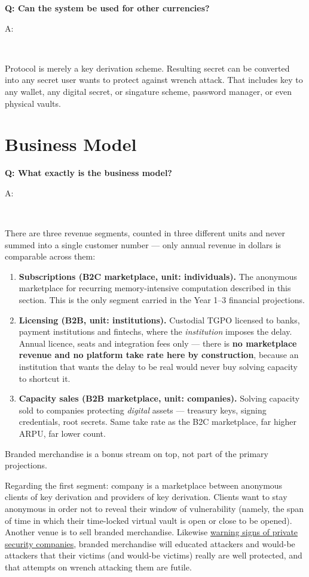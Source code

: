 \documentclass[12pt,a4paper]{article}
\newenvironment{question}[1]{%
  \vspace{0.8em}\noindent\textbf{Q: #1}\par
  \vspace{0.2em}\noindent\begin{itshape}A:\end{itshape}~%
}{\vspace{0.8em}}
\newcommand{\privsecplaque}{https://duckduckgo.com/?q=prosegur+verisure+\%22warning+sign\%22+facade\&iar=images\&t=brave\&iaf=type\%3Aphoto}
\begin{document}
\begin{question}{Can the system be used for other currencies?}
Protocol is merely a key derivation scheme. Resulting secret can be converted into any secret user wants to protect against wrench attack. That includes key to any wallet, any digital secret, or singature scheme, password manager, or even physical vaults.
\end{question}

\section{Business Model}

\begin{question}{What exactly is the business model?}
There are three revenue segments, counted in three different units and never summed into a single customer number --- only annual revenue in dollars is comparable across them:
\begin{enumerate}
 \item \textbf{Subscriptions (B2C marketplace, unit: individuals).} The anonymous marketplace for recurring memory-intensive computation described in this section. This is the only segment carried in the Year 1--3 financial projections.
 \item \textbf{Licensing (B2B, unit: institutions).} Custodial TGPO licensed to banks, payment institutions and fintechs, where the \emph{institution} imposes the delay. Annual licence, seats and integration fees only --- there is \textbf{no marketplace revenue and no platform take rate here by construction}, because an institution that wants the delay to be real would never buy solving capacity to shortcut it.
 \item \textbf{Capacity sales (B2B marketplace, unit: companies).} Solving capacity sold to companies protecting \emph{digital} assets --- treasury keys, signing credentials, root secrets. Same take rate as the B2C marketplace, far higher ARPU, far lower count.
\end{enumerate}
Branded merchandise is a bonus stream on top, not part of the primary projections.

Regarding the first segment: company is a marketplace between anonymous clients of key derivation and providers of key derivation. Clients want to stay anonymous in order not to reveal their window of vulnerability (namely, the span of time in which their time-locked virtual vault is open or close to be opened).
Another venue is to sell branded merchandise. Likewise \href{\privsecplaque}{warning signs of private security companies}, branded merchandise will educated attackers and would-be attackers that their victims (and would-be victims) really are well protected, and that attempts on wrench attacking them are futile.
\end{question}
\end{document}
